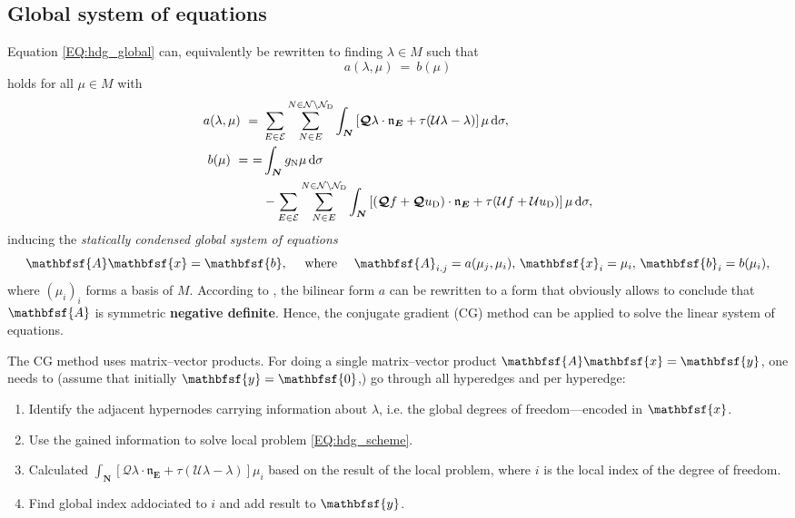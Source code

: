 \documentclass[a4paper, english, 12pt, reqno, draft]{amsart}
\theoremstyle{definition}
\theoremstyle{remark}
\numberwithin{equation}{section}
\newcommand{\setEdge}{\ensuremath{\mathcal E}}
\newcommand{\setNode}{\ensuremath{\mathcal N}}
\newcommand{\setNodeDir}{\ensuremath{\setNode_\textup D}}
\newcommand{\edge}{\ensuremath{E}}
\newcommand{\node}{\ensuremath{N}}
\newcommand{\Edge}{{\ensuremath{\boldsymbol E}}}
\newcommand{\Node}{{\ensuremath{\boldsymbol N}}}
\newcommand{\Normal}{\ensuremath{\mathfrak n_\Edge}}
\newcommand{\skeletalSpace}{\ensuremath{M}}
\renewcommand{\vec}[1]{\ensuremath{\boldsymbol{#1}}}
\newcommand{\vecc}[1]{\ensuremath{\mathbfsf{#1}}}
\newcommand{\ds}{\ensuremath{\, \textup d \sigma}}
\newcommand{\localU}{\ensuremath{\mathcal U}}
\newcommand{\localQ}{\ensuremath{\vec{\mathcal Q}}}
\begin{document}
\subsection{Global system of equations}\label{SEC:glob_system}
% 
Equation \eqref{EQ:hdg_global} can, equivalently be rewritten to finding $\lambda \in \skeletalSpace$ such that
%
\begin{equation*}
 a(\lambda, \mu) ~=~ b(\mu)
\end{equation*}
% 
holds for all $\mu \in \skeletalSpace$ with
% 
\begin{subequations}\label{EQ:forms_def}
\begin{align}
 a(\lambda, \mu) ~=~ & \sum_{\edge \in \setEdge} \sum^{\node \in \setNode \setminus \setNodeDir}_{\node \in \edge} \int_\Node \left[ \localQ \lambda \cdot \Normal + \tau (\localU \lambda - \lambda) \right] \mu \ds,\label{EQ:bil_def}\\
 b(\mu) ~=~= & \int_\Node g_\textup N \mu \ds \label{EQ:lin_def}\\
 & - \sum_{\edge \in \setEdge} \sum^{\node \in \setNode \setminus \setNodeDir}_{\node \in \edge} \int_\Node \left[ (\localQ f + \localQ u_\textup D) \cdot \Normal + \tau (\localU f + \localU u_\textup D) \right] \mu \ds,\notag
\end{align}
\end{subequations}
% 
inducing the \emph{statically condensed global system of equations}
% 
\begin{equation*}
 \vecc A \vecc x = \vecc b, \quad \text{ where } \quad \vecc A_{i.j} = a(\mu_j, \mu_i), \, \vecc x_i = \mu_i, \, \vecc b_i = b(\mu_i),
\end{equation*}
% 
where $(\mu_i)_i$ forms a basis of $\skeletalSpace$. According to \cite[Thm.~2.1 \& (2.11.a)]{CockburnGL2009}, the bilinear form $a$ can be rewritten to a form that obviously allows to conclude that $\vecc A$ is symmetric \textbf{negative definite}. Hence, the conjugate gradient (CG) method can be applied to solve the linear system of equations.

The CG method uses matrix--vector products. For doing a single matrix--vector product $\vecc A \vecc x = \vecc y$, one needs to (assume that initially $\vecc y = \vecc 0$,) go through all hyperedges and per hyperedge:
% 
\begin{enumerate}
 \item Identify the adjacent hypernodes carrying information about $\lambda$, i.e. the global degrees of freedom---encoded in $\vecc x$.
 \item Use the gained information to solve local problem \eqref{EQ:hdg_scheme}.
 \item Calculated $\int_\Node \left[ \localQ \lambda \cdot \Normal + \tau (\localU \lambda - \lambda) \right] \mu_i$ based on the result of the local problem, where $i$ is the local index of the degree of freedom.
 \item Find global index addociated to $i$ and add result to $\vecc y$.
\end{enumerate}
% 
\end{document}
